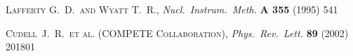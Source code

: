 \documentclass[TOTEM]{cern/cernphprep}
\def\etal{et al.}
\def\Name#1{\textsc{#1}, }
\def\REVIEW#1#2#3#4{{\it #1} {\bf #2} (#3) #4}
\begin{document}
\begin{thebibliography}{99}
	\Name{Lafferty G.~D.~and Wyatt T.~R.}
	\REVIEW{Nucl.\ Instrum.\ Meth.}{A 355}{1995}{541}

	\Name{Cudell~J.~R.~\etal{} (COMPETE Collaboration)}
	\REVIEW{Phys.\ Rev.\ Lett.}{89}{2002}{201801}

\fi

\end{thebibliography}
\end{document}
